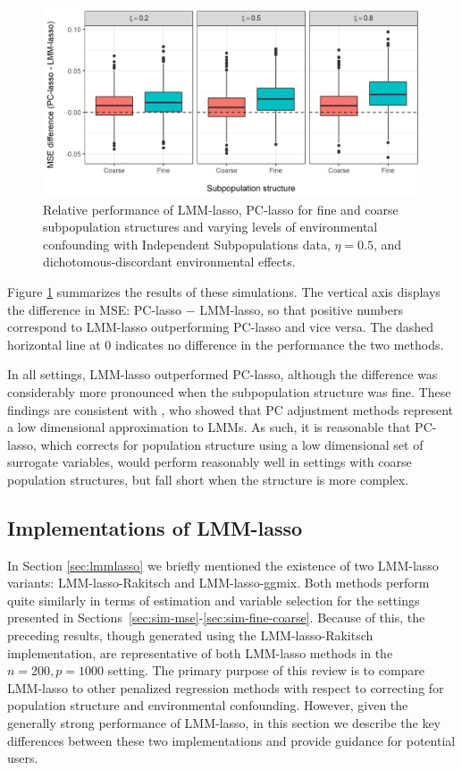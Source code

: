 \begin{figure}[H]
    \centering
    \includegraphics[scale = 0.9]{figures/mse_diff_subpops.png}
    \caption{Relative performance of LMM-lasso, PC-lasso for fine and coarse subpopulation structures and varying levels of environmental confounding with Independent Subpopulations data, $\eta = 0.5$, and dichotomous-discordant environmental effects. }
    \label{fig:big_vs_small}
\end{figure}

Figure \ref{fig:big_vs_small} summarizes the results of these simulations. The vertical axis displays the difference in MSE: PC-lasso $-$ LMM-lasso, so that positive numbers correspond to LMM-lasso outperforming PC-lasso and vice versa. The dashed horizontal line at 0 indicates no difference in the performance the two methods.

In all settings, LMM-lasso outperformed PC-lasso, although the difference was considerably more pronounced when the subpopulation structure was fine.  These findings are consistent with \citet{hoffman2013correcting}, who showed that PC adjustment methods represent a low dimensional approximation to LMMs. As such, it is reasonable that PC-lasso, which corrects for population structure using a low dimensional set of surrogate variables, would perform reasonably well in settings with coarse population structures, but fall short when the structure is more complex.

\subsection{Implementations of LMM-lasso}

In Section \ref{sec:lmmlasso} we briefly mentioned the existence of two LMM-lasso variants: LMM-lasso-Rakitsch and LMM-lasso-ggmix. Both methods perform quite similarly in terms of estimation and variable selection for the settings presented in Sections~\ref{sec:sim-mse}-\ref{sec:sim-fine-coarse}. Because of this, the preceding results, though generated using the LMM-lasso-Rakitsch implementation, are representative of both LMM-lasso methods in the $n = 200, p = 1000$ setting. The primary purpose of this review is to compare LMM-lasso to other penalized regression methods with respect to correcting for population structure and environmental confounding. However, given the generally strong performance of LMM-lasso, in this section we describe the key differences between these two implementations and provide guidance for potential users.

